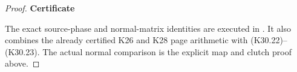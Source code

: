 \begin{proof}
\par

\medskip\noindent\textbf{Certificate}

\par\nobreak

The exact source-phase and normal-matrix identities are
executed in . It also
combines the already certified K26 and K28 page arithmetic
with (K30.22)--(K30.23). The actual normal comparison is
the explicit map and clutch proof above.

\end{proof}
